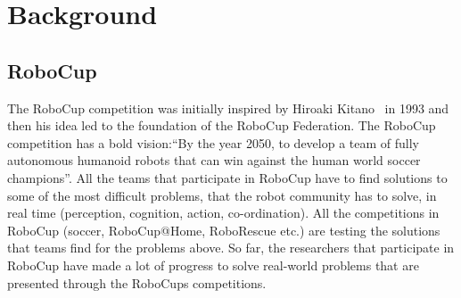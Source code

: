 \chapter{Background}
\label{Background}
\section{RoboCup}
The RoboCup competition was initially inspired by Hiroaki Kitano~\cite{robocup} in 1993 and then his idea led to the foundation of the RoboCup Federation. The RoboCup competition has a bold vision:``By the year 2050, to develop a team of fully autonomous humanoid robots that can win against the human world soccer champions''. All the teams that participate in RoboCup have to find solutions to some of the most difficult problems, that the robot community has to solve, in real time (perception, cognition, action, co-ordination). All the competitions in RoboCup (soccer, RoboCup@Home, RoboRescue etc.) are testing the solutions that teams find for the problems above. So far, the researchers that participate in RoboCup have made a lot of progress to solve real-world problems that are presented through the RoboCups competitions.

